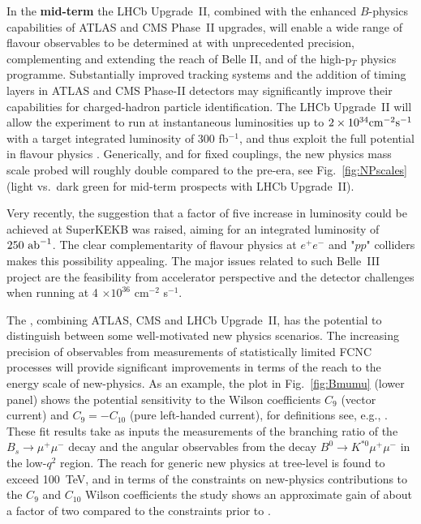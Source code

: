 In the {\bf mid-term}
the LHCb Upgrade~II, combined with the enhanced $B$-physics capabilities of ATLAS and CMS Phase~II upgrades, will enable a wide range of flavour observables to be determined at \HLLHC with unprecedented precision, complementing and extending the reach of Belle II, and of the high-p$_T$ physics programme.
Substantially improved tracking systems and the addition of timing layers in ATLAS and  CMS Phase-II detectors may significantly improve their capabilities for charged-hadron  particle identification.
The LHCb Upgrade~II will allow the experiment to run at instantaneous luminosities up to $2 \times 10^{34}{\rm cm}^{-2} {\rm s}^{-1}$ with a target integrated luminosity of 300 fb$^{-1}$, and thus exploit the full \HLLHC potential in flavour physics \cite{Bediaga:2018lhg, Cerri:2018ypt}.
Generically, and for fixed couplings, the new physics mass scale probed  will roughly double compared to the pre-\HLLHC era, see Fig.~\ref{fig:NPscales} (light vs.\ dark green for mid-term prospects with LHCb Upgrade~II).

Very recently, the suggestion that a factor of five increase in luminosity could be achieved at SuperKEKB was raised, aiming for an integrated luminosity of $250~{\rm ab}^{-1}$.
The clear complementarity of flavour physics at $e^+ e^-$ and "$pp$" colliders makes this possibility appealing. 
The major issues related to such Belle~III project  
are the feasibility from accelerator perspective and the detector challenges when running at 4 $\times 10^{36}$
cm$^{-2}$ s$^{-1}$.

The \HLLHC, combining ATLAS, CMS and LHCb Upgrade~II, has the potential to distinguish between some well-motivated  
new physics scenarios. 
The increasing precision of observables from measurements of statistically limited FCNC processes will provide significant improvements in terms of the reach to the energy scale of new-physics. 
As an example, the  plot in Fig.~\ref{fig:Bmumu} (lower panel) shows the potential sensitivity to the Wilson coefficients $C_9$ (vector current) and $C_9=-C_{10}$ (pure left-handed current), for definitions see, e.g., \cite{Aebischer:2019mlg}.
These fit results take as inputs the measurements of the branching ratio of the  $B_s\to\mu^+\mu^-$ decay and the angular observables from the decay $B^0 \to K^{\ast 0} \mu^+\mu^-$ in the low-$q^2$ region. The reach for generic new physics at tree-level is found to exceed 100~TeV, and in terms of the constraints on new-physics contributions to the $C_9$ and $C_{10}$ Wilson coefficients the study shows an approximate gain of about a factor of two compared to the constraints prior to \HLLHC. 

